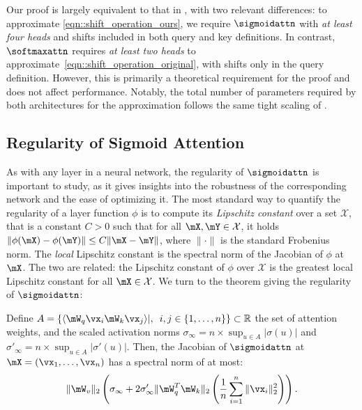 Our proof is largely equivalent to that in \cite{Yun_UAP}, with two relevant differences: to approximate \cref{eqn::shift_operation_ours}, we require $\sigmoidattn$ with \textit{at least four heads} and shifts included in both query and key definitions. In contrast, $\softmaxattn$ requires \textit{at least two heads} to approximate~\cref{eqn::shift_operation_original}, with shifts only in the query definition. However, this is primarily a theoretical requirement for the proof and does not affect performance. Notably, the total number of parameters required by both architectures for the approximation follows the same tight scaling of \cite{Yun_UAP}.






\subsection{Regularity of Sigmoid Attention}
\label{sec:regularity}
As with any layer in a neural network, the regularity of $\sigmoidattn$ is important to study, as it gives insights into the robustness of the corresponding network and the ease of optimizing it.
The most standard way to quantify the regularity of a layer function $\phi$ is to compute its \emph{Lipschitz constant} over a set $\mathcal{X}$, that is a constant $C>0$ such that for all $\mX, \mY\in \mathcal{X}$, it holds $\|\phi(\mX) - \phi(\mY)\|\leq C \|\mX - \mY\|$, where $\|\cdot\|$ is the standard Frobenius norm.
The \emph{local} Lipschitz constant is the spectral norm of the Jacobian of $\phi$ at $\mX$.
The two are related: the Lipschitz constant of $\phi$ over $\mathcal{X}$ is the greatest local Lipschitz constant for all $\mX\in \mathcal{X}$.
We turn to the theorem giving the regularity of $\sigmoidattn$:
\begin{theorem}
\label{thm:regularity}
    Define $A = \{\langle \mW_q \vx_i \mW_k \vx_j\rangle|,\enspace i, j\in \{1,\dots,n\}\}\subset\mathbb{R}$ the set of attention weights,  and the scaled activation norms $\sigma_{\infty} = n\times\sup_{u\in A} |\sigma(u)|$ and $\sigma'_{\infty} = n\times \sup_{u\in A} |\sigma'(u)|$.
    Then, the Jacobian of $\sigmoidattn$ at $\mX = (\vx_1, \dots, \vx_n)$ has a spectral norm of at most:
    \begin{equation}
        \|\mW_v\|_2\left(\sigma_{\infty} + 2\sigma'_{\infty} \|\mW_q^T \mW_k\|_2\left(\frac1n\sum_{i=1}^n\|\vx_i\|_2^2\right)\right).
    \end{equation}
\end{theorem}
